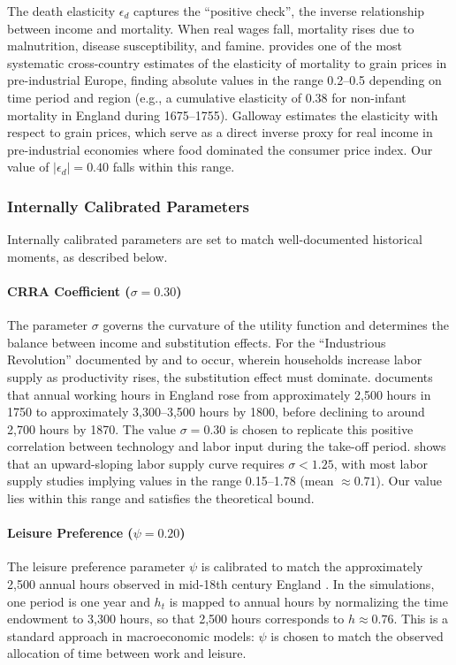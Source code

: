 \documentclass[11pt,a4paper]{article}
\begin{document}
The death elasticity \(\epsilon_d\) captures the ``positive check'', the inverse relationship between income and mortality. When real wages fall, mortality rises due to malnutrition, disease susceptibility, and famine. \textcite{Galloway1988} provides one of the most systematic cross-country estimates of the elasticity of mortality to grain prices in pre-industrial Europe, finding absolute values in the range 0.2--0.5 depending on time period and region (e.g., a cumulative elasticity of 0.38 for non-infant mortality in England during 1675--1755). Galloway estimates the elasticity with respect to grain prices, which serve as a direct inverse proxy for real income in pre-industrial economies where food dominated the consumer price index. Our value of \(|\epsilon_d| = 0.40\) falls within this range.

\subsubsection*{Internally Calibrated Parameters}

Internally calibrated parameters are set to match well-documented historical moments, as described below.

\paragraph{CRRA Coefficient (\(\sigma = 0.30\))}
The parameter \(\sigma\) governs the curvature of the utility function and determines the balance between income and substitution effects. For the ``Industrious Revolution'' documented by \textcite{Voth2001} and \textcite{DeVries2008} to occur, wherein households increase labor supply as productivity rises, the substitution effect must dominate. \textcite{Voth2001} documents that annual working hours in England rose from approximately 2,500 hours in 1750 to approximately 3,300--3,500 hours by 1800, before declining to around 2,700 hours by 1870. The value \(\sigma = 0.30\) is chosen to replicate this positive correlation between technology and labor input during the take-off period. \textcite{Chetty2006} shows that an upward-sloping labor supply curve requires \(\sigma < 1.25\), with most labor supply studies implying values in the range 0.15--1.78 (mean \(\approx 0.71\)). Our value lies within this range and satisfies the theoretical bound.

\paragraph{Leisure Preference (\(\psi = 0.20\))}
The leisure preference parameter \(\psi\) is calibrated to match the approximately 2,500 annual hours observed in mid-18th century England \parencite{Voth2001}. In the simulations, one period is one year and \(h_t\) is mapped to annual hours by normalizing the time endowment to 3,300 hours, so that 2,500 hours corresponds to \(h \approx 0.76\). This is a standard approach in macroeconomic models: \(\psi\) is chosen to match the observed allocation of time between work and leisure.
\end{document}
